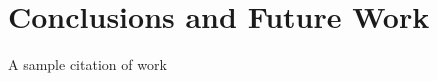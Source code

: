 \chapter{Conclusions and Future Work}
\label{chap:conclusions}

\lipsum[5]

A sample citation of work \cite{nath2020better}